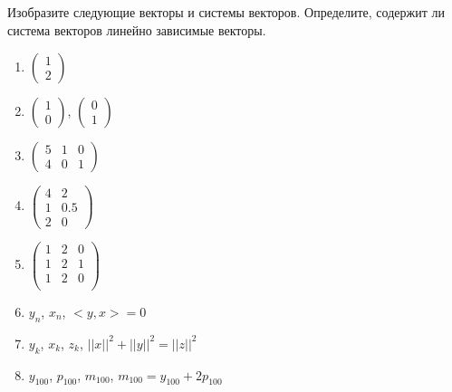 \documentclass[11pt, a4paper]{extarticle}
\begin{document}
	\subsection{}
	Изобразите следующие векторы и системы векторов. Определите, содержит ли система векторов линейно зависимые векторы. 
		\begin{multicols}{2}
		\begin{enumerate}[label=\alph*)]
			\item $\begin{pmatrix}
			1 \\
			2
			\end{pmatrix}$
			\item $\begin{pmatrix}
			1 \\
			0
			\end{pmatrix}$, 
			$\begin{pmatrix}
			0 \\
			1
			\end{pmatrix}$
			\item$\begin{pmatrix}
			5 & 1 & 0 \\
			4 & 0 & 1
			\end{pmatrix}$
			\item $\begin{pmatrix}
			4 & 2 \\
			1 & 0.5 \\
			2 & 0
			\end{pmatrix}$
			\item $\begin{pmatrix}
			1 & 2 & 0 \\
			1 & 2 & 1 \\
			1 & 2 & 0 \\
			\end{pmatrix}$
			\item $y_n$, $x_n$, $<y, x> = 0$
			\item $y_k$, $x_k$, $z_k$, $||x||^2 + ||y||^2 = ||z||^2$
			\item $y_{100}$, $p_{100}$, $m_{100}$, $m_{100} = y_{100} + 2p_{100}$
		\end{enumerate}
	\end{multicols}
	
\end{document}
